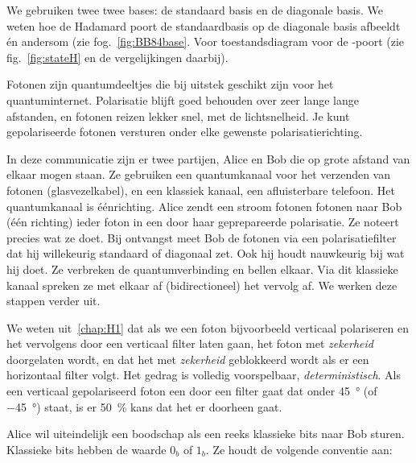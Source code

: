 \documentclass[../../main.tex]{subfiles}
\begin{document}
We gebruiken twee twee bases: de standaard basis en de diagonale basis. We weten hoe de Hadamard poort de standaardbasis op de diagonale basis afbeeldt \'en andersom (zie fog.~\ref{fig:BB84base}.
Voor toestandsdiagram voor de -poort (zie fig.~\ref{fig:stateH} en de vergelijkingen daarbij).

Fotonen zijn quantumdeeltjes die bij uitstek geschikt zijn voor het quantuminternet. Polarisatie blijft goed behouden over zeer lange lange afstanden, en fotonen reizen lekker snel, met de lichtsnelheid. Je kunt gepolariseerde fotonen versturen onder elke gewenste polarisatierichting. 

In deze communicatie zijn er twee partijen, Alice en Bob die op grote afstand van elkaar mogen staan. Ze gebruiken een quantumkanaal voor het verzenden van fotonen (glasvezelkabel), en een klassiek kanaal, een afluisterbare telefoon. Het quantumkanaal is \'e\'enrichting. Alice zendt een stroom fotonen fotonen naar Bob (\'e\'en richting) ieder foton in een door haar geprepareerde polarisatie. Ze noteert precies wat ze doet. Bij ontvangst meet Bob de fotonen via een polarisatiefilter dat hij willekeurig standaard of diagonaal zet. Ook hij houdt nauwkeurig bij wat hij doet. Ze verbreken de quantumverbinding en bellen elkaar. Via dit klassieke kanaal spreken ze met elkaar af (bidirectioneel) het vervolg af. We werken deze stappen verder uit.

We weten  uit~\ref{chap:H1} dat als we een foton bijvoorbeeld verticaal polariseren en het vervolgens door een verticaal filter laten gaan, het foton met \textit{zekerheid} doorgelaten wordt, en dat het met \textit{zekerheid }geblokkeerd wordt als er een horizontaal filter volgt. Het gedrag is volledig voorspelbaar, \textit{deterministisch}. Als een verticaal gepolariseerd foton een door een filter gaat dat onder \SI{45}{\degree} (of \SI{-45}{\degree}) staat, is er \SI{50}{\percent} kans dat het er doorheen gaat.

Alice wil uiteindelijk een boodschap als een reeks klassieke bits naar Bob sturen. Klassieke bits hebben de waarde $0_b$ of $1_b$. Ze houdt de volgende conventie aan:
\end{document}
